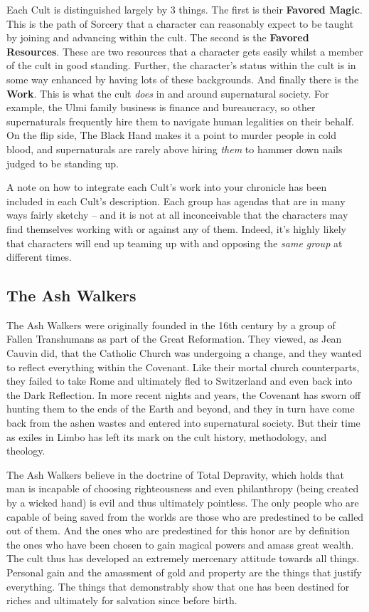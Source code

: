 Each Cult is distinguished largely by 3 things. The first is their \textbf{Favored Magic}. This is the path of Sorcery that a character can reasonably expect to be taught by joining and advancing within the cult. The second is the \textbf{Favored Resources}. These are two resources that a character gets easily whilst a member of the cult in good standing. Further, the character's status within the cult is in some way enhanced by having lots of these backgrounds. And finally there is the \textbf{Work}. This is what the cult \textit{does} in and around supernatural society. For example, the Ulmi family business is finance and bureaucracy, so other supernaturals frequently hire them to navigate human legalities on their behalf. On the flip side, The Black Hand makes it a point to murder people in cold blood, and supernaturals are rarely above hiring \textit{them} to hammer down nails judged to be standing up.

A note on how to integrate each Cult's work into your chronicle has been included in each Cult's description. Each group has agendas that are in many ways fairly sketchy -- and it is not at all inconceivable that the characters may find themselves working with or against any of them. Indeed, it's highly likely that characters will end up teaming up with and opposing the \textit{same group} at different times.

\subsection{The Ash Walkers} 

The Ash Walkers were originally founded in the 16th century by a group of Fallen Transhumans as part of the Great Reformation. They viewed, as Jean Cauvin did, that the Catholic Church was undergoing a change, and they wanted to reflect everything within the Covenant. Like their mortal church counterparts, they failed to take Rome and ultimately fled to Switzerland and even back into the Dark Reflection. In more recent nights and years, the Covenant has sworn off hunting them to the ends of the Earth and beyond, and they in turn have come back from the ashen wastes and entered into supernatural society. But their time as exiles in Limbo has left its mark on the cult history, methodology, and theology.

The Ash Walkers believe in the doctrine of Total Depravity, which holds that man is incapable of choosing righteousness and even philanthropy (being created by a wicked hand) is evil and thus ultimately pointless. The only people who are capable of being saved from the worlds are those who are predestined to be called out of them. And the ones who are predestined for this honor are by definition the ones who have been chosen to gain magical powers and amass great wealth. The cult thus has developed an extremely mercenary attitude towards all things. Personal gain and the amassment of gold and property are the things that justify everything. The things that demonstrably show that one has been destined for riches and ultimately for salvation since before birth.

